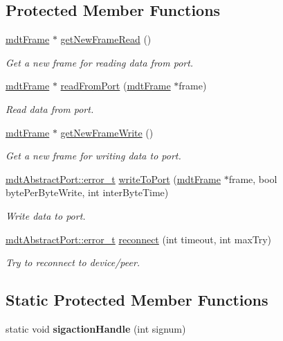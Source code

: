 \subsection*{Protected Member Functions}
\begin{DoxyCompactItemize}
\item 
\hyperlink{classmdt_frame}{mdtFrame} $\ast$ \hyperlink{classmdt_port_thread_a611211e56620ec9c699019452716e4fc}{getNewFrameRead} ()
\begin{DoxyCompactList}\small\item\em Get a new frame for reading data from port. \end{DoxyCompactList}\item 
\hyperlink{classmdt_frame}{mdtFrame} $\ast$ \hyperlink{classmdt_port_thread_a7e6e152839e35b8fbd1eb299c1d0b2fe}{readFromPort} (\hyperlink{classmdt_frame}{mdtFrame} $\ast$frame)
\begin{DoxyCompactList}\small\item\em Read data from port. \end{DoxyCompactList}\item 
\hyperlink{classmdt_frame}{mdtFrame} $\ast$ \hyperlink{classmdt_port_thread_acba4fce38a633da68ec23fe191ba6105}{getNewFrameWrite} ()
\begin{DoxyCompactList}\small\item\em Get a new frame for writing data to port. \end{DoxyCompactList}\item 
\hyperlink{classmdt_abstract_port_ad4121bb930c95887e77f8bafa065a85e}{mdtAbstractPort::error\_\-t} \hyperlink{classmdt_port_thread_a9372a53561362b0c86f499b8a36805e1}{writeToPort} (\hyperlink{classmdt_frame}{mdtFrame} $\ast$frame, bool bytePerByteWrite, int interByteTime)
\begin{DoxyCompactList}\small\item\em Write data to port. \end{DoxyCompactList}\item 
\hyperlink{classmdt_abstract_port_ad4121bb930c95887e77f8bafa065a85e}{mdtAbstractPort::error\_\-t} \hyperlink{classmdt_port_thread_aaea2513ab1611574111dd1c2b7e61b7c}{reconnect} (int timeout, int maxTry)
\begin{DoxyCompactList}\small\item\em Try to reconnect to device/peer. \end{DoxyCompactList}\end{DoxyCompactItemize}
\subsection*{Static Protected Member Functions}
\begin{DoxyCompactItemize}
\item 
\hypertarget{classmdt_port_thread_a01d2362e0dfcece4cba242cb586d8d1c}{
static void {\bfseries sigactionHandle} (int signum)}
\label{classmdt_port_thread_a01d2362e0dfcece4cba242cb586d8d1c}

\end{DoxyCompactItemize}
